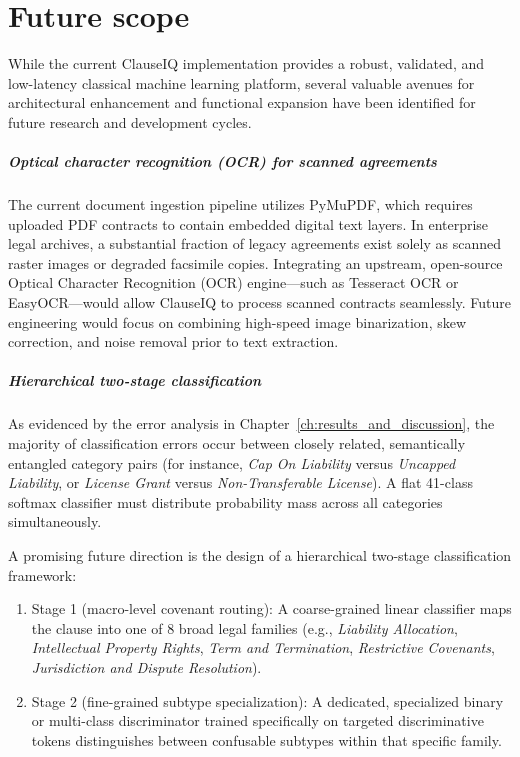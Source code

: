 \chapter{Future scope}
\label{ch:future_scope}

While the current ClauseIQ implementation provides a robust, validated, and low-latency classical machine learning platform, several valuable avenues for architectural enhancement and functional expansion have been identified for future research and development cycles.

\paragraph*{Optical character recognition (OCR) for scanned agreements}
The current document ingestion pipeline utilizes PyMuPDF, which requires uploaded PDF contracts to contain embedded digital text layers. In enterprise legal archives, a substantial fraction of legacy agreements exist solely as scanned raster images or degraded facsimile copies. Integrating an upstream, open-source Optical Character Recognition (OCR) engine---such as Tesseract OCR or EasyOCR---would allow ClauseIQ to process scanned contracts seamlessly. Future engineering would focus on combining high-speed image binarization, skew correction, and noise removal prior to text extraction.

\paragraph*{Hierarchical two-stage classification}
As evidenced by the error analysis in Chapter~\ref{ch:results_and_discussion}, the majority of classification errors occur between closely related, semantically entangled category pairs (for instance, \textit{Cap On Liability} versus \textit{Uncapped Liability}, or \textit{License Grant} versus \textit{Non-Transferable License}). A flat 41-class softmax classifier must distribute probability mass across all categories simultaneously.

A promising future direction is the design of a hierarchical two-stage classification framework:
\begin{enumerate}
    \item Stage 1 (macro-level covenant routing): A coarse-grained linear classifier maps the clause into one of 8 broad legal families (e.g., \textit{Liability Allocation}, \textit{Intellectual Property Rights}, \textit{Term and Termination}, \textit{Restrictive Covenants}, \textit{Jurisdiction and Dispute Resolution}).
    \item Stage 2 (fine-grained subtype specialization): A dedicated, specialized binary or multi-class discriminator trained specifically on targeted discriminative tokens distinguishes between confusable subtypes within that specific family.
\end{enumerate}

